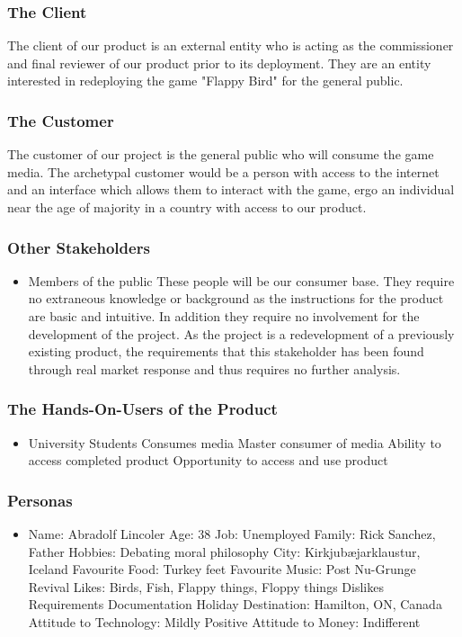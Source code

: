 \documentclass[11pt, oneside]{article}   	%
\begin{document}
\subsubsection*{The Client}
The client of our product is an external entity who is acting as the commissioner and final reviewer of our product prior to its deployment. They are an entity interested in redeploying the game "Flappy Bird" for the general public.


\subsubsection*{The Customer}
The customer of our project is the general public who will consume the game media. The archetypal customer would be a person with access to the internet and an interface which allows them to interact with the game, ergo an individual near the age of majority in a country with access to our product.


\subsubsection*{Other Stakeholders}
\begin{itemize}
\item Members of the public
\subitem These people will be our consumer base. They require no extraneous knowledge or background as the instructions for the product are basic and intuitive. In addition they require no involvement for the development of the project. As the project is a redevelopment of a previously existing product, the requirements that this stakeholder has been found through real market response and thus requires no further analysis.

\end{itemize}


\subsubsection*{The Hands-On-Users of the Product}
\begin{itemize}
\item University Students
\subitem Consumes media
\subitem Master consumer of media
\subitem Ability to access completed product
\subitem Opportunity to access and use product
\end{itemize}


\subsubsection*{Personas}
\begin{itemize}
\item Name: Abradolf Lincoler
\subitem Age: 38
\subitem Job: Unemployed
\subitem Family: Rick Sanchez, Father
\subitem Hobbies: Debating moral philosophy
\subitem City: Kirkjub\ae jarklaustur, Iceland
\subitem Favourite Food: Turkey feet
\subitem Favourite Music: Post Nu-Grunge Revival
\subitem Likes: Birds, Fish, Flappy things, Floppy things
\subitem Dislikes Requirements Documentation
\subitem Holiday Destination:  Hamilton, ON, Canada
\subitem Attitude to Technology: Mildly Positive
\subitem Attitude to Money: Indifferent
\end{itemize}
\end{document}
